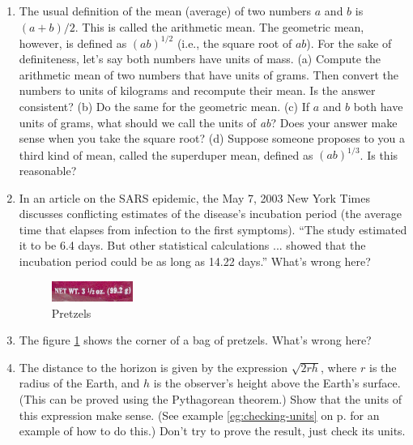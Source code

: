 \begin{enumerate}
\item The usual definition of the mean (average) of two
numbers $a$ and $b$ is $(a+b)/2$. This is called the
arithmetic mean. The geometric mean, however, is defined as
$(ab)^{1/2}$ (i.e., the square root of $ab$). For the sake of definiteness, let's say both
numbers have units of mass. (a) Compute the arithmetic mean
of two numbers that have units of grams. Then convert the
numbers to units of kilograms and recompute their mean. Is
the answer consistent? (b) Do the same for the geometric
mean. (c) If $a$ and $b$ both have units of grams, what
should we call the units of \emph{ab}? Does your answer make
sense when you take the square root? (d) Suppose someone
proposes to you a third kind of mean, called the superduper
mean, defined as $(ab)^{1/3}$. Is this reasonable?

\item 
 In an article on the SARS epidemic, the May 7, 2003 New
York Times discusses conflicting estimates of the disease's
incubation period (the average time that elapses from
infection to the first symptoms). ``The study estimated it
to be 6.4 days. But other statistical calculations ...
showed that the incubation period could be as long as 14.22
days.'' What's wrong here?

\begin{figure}[ht]
\begin{center}
\includegraphics[width=0.25\textwidth]{./introduction/figs/pretzels}
\caption{ Pretzels}
\label{pretzel}
\end{center}
\end{figure}

\vspace{1.5mm}

\item 
 The figure \ref{pretzel} shows the corner of a bag of pretzels. What's wrong here?

\item 
The distance to the horizon is given by the expression $\sqrt{2rh}$, where $r$ is the
radius of the Earth, and $h$ is the observer's height above the Earth's surface. (This can
be proved using the Pythagorean theorem.) Show that the units of this expression make
sense. (See example \ref{eg:checking-units} on p.
\pageref{eg:checking-units} for an example of how to do this.)
Don't try to prove the result, just check its units.

\end{enumerate}






